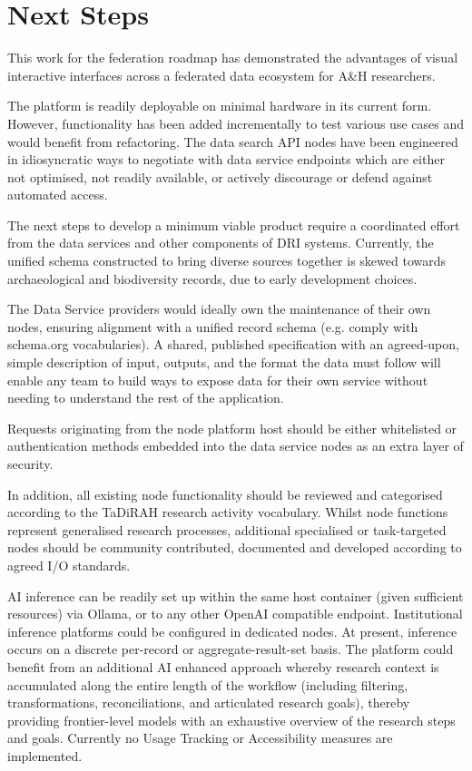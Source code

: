 \documentclass[11pt]{scrartcl}
\begin{document}
\section{Next Steps}
This work for the federation roadmap has demonstrated the advantages of visual interactive interfaces across a federated data ecosystem for A\&H researchers. 

The platform is readily deployable on minimal hardware in its current form. However, functionality has been added incrementally to test various use cases and would benefit from refactoring. The data search API nodes have been engineered in idiosyncratic ways to negotiate with data service endpoints which are either not optimised, not readily available, or actively discourage or defend against automated access.

The next steps to develop a minimum viable product require a coordinated effort from the data services and other components of DRI systems. Currently, the unified schema constructed to bring diverse sources together is skewed towards archaeological and biodiversity records, due to early development choices. 

The Data Service providers would ideally own the maintenance of their own nodes, ensuring alignment with a unified record schema (e.g. comply with schema.org vocabularies). A shared, published specification with an agreed-upon, simple description of input, outputs, and the format the data must follow will enable any team to build ways to expose data for their own service without needing to understand the rest of the application.

Requests originating from the node platform host should be either whitelisted or authentication methods embedded into the data service nodes as an extra layer of security.

In addition, all existing node functionality should be reviewed and categorised according to the TaDiRAH research activity vocabulary. Whilst node functions represent generalised research processes, additional specialised or task-targeted nodes should be community contributed, documented and developed according to agreed I/O standards.

AI inference can be readily set up within the same host container (given sufficient resources) via Ollama, or to any other OpenAI compatible endpoint. Institutional inference platforms could be configured in dedicated nodes. At present, inference occurs on a discrete per-record or aggregate-result-set basis. The platform could benefit from an additional AI enhanced approach whereby research context is accumulated along the entire length of the workflow (including filtering, transformations, reconciliations, and articulated research goals), thereby providing frontier-level models with an exhaustive overview of the research steps and goals. Currently no Usage Tracking or Accessibility measures are implemented.
\end{document}
